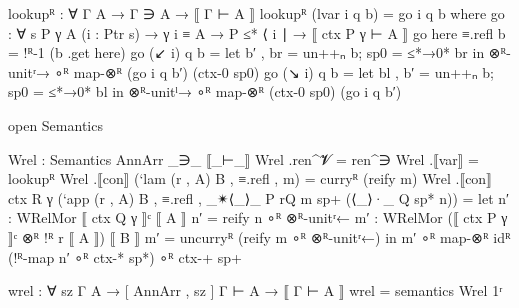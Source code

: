 \begin{code}
      lookupᴿ : ∀ {Γ A} → Γ ∋ A → ⟦ Γ ⊢ A ⟧
      lookupᴿ (lvar i q b) = go i q b
        where
        go : ∀ {s P γ A} (i : Ptr s) → γ i ≡ A → P ≤* ⟨ i ∣ → ⟦ ctx P γ ⊢ A ⟧
        go here ≡.refl b = !ᴿ-1 (b .get here)
        go (↙ i) q b =
          let b′ , br = un++ₙ b; sp0 = ≤*→0* br in
          ⊗ᴿ-unitʳ→ ∘ᴿ map-⊗ᴿ (go i q b′) (ctx-0 sp0)
        go (↘ i) q b =
          let bl , b′ = un++ₙ b; sp0 = ≤*→0* bl in
          ⊗ᴿ-unitˡ→ ∘ᴿ map-⊗ᴿ (ctx-0 sp0) (go i q b′)

      open Semantics

      Wrel : Semantics AnnArr _∋_ ⟦_⊢_⟧
      Wrel .ren^𝓥 = ren^∋
      Wrel .⟦var⟧ = lookupᴿ
      Wrel .⟦con⟧ (`lam (r , A) B , ≡.refl , m) = curryᴿ (reify m)
      Wrel .⟦con⟧ {ctx R γ}
        (`app (r , A) B , ≡.refl , _✴⟨_⟩_ {P} {rQ} m sp+ (⟨_⟩·_ {Q} sp* n)) =
        let n′ : WRelMor ⟦ ctx Q γ ⟧ᶜ ⟦ A ⟧
            n′ = reify n ∘ᴿ ⊗ᴿ-unitʳ←
            m′ : WRelMor (⟦ ctx P γ ⟧ᶜ ⊗ᴿ !ᴿ r ⟦ A ⟧) ⟦ B ⟧
            m′ = uncurryᴿ (reify m ∘ᴿ ⊗ᴿ-unitʳ←)
        in
        m′ ∘ᴿ map-⊗ᴿ idᴿ (!ᴿ-map n′ ∘ᴿ ctx-* sp*) ∘ᴿ ctx-+ sp+

      wrel : ∀ {sz Γ A} → [ AnnArr , sz ] Γ ⊢ A → ⟦ Γ ⊢ A ⟧
      wrel = semantics Wrel 1ʳ
\end{code}
